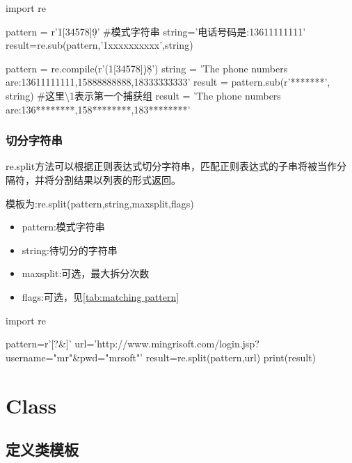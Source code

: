 \documentclass{article}
\begin{document}
        \begin{codeblock}[language=python, caption={string substitution}]
          import re

          pattern = r'1[34578]\d{9}' #模式字符串
          string='电话号码是:13611111111'
          result=re.sub(pattern,'1xxxxxxxxxx',string)

          pattern = re.compile(r'(1[34578]\d)\d{8}')
          string = 'The phone numbers are:13611111111,15888888888,18333333333'
          result = pattern.sub(r'\1********', string) #这里\textbackslash 1表示第一个捕获组
          result = 'The phone numbers are:136********,158********,183********'
        \end{codeblock}

      \subsubsection{切分字符串}
        re.split方法可以根据正则表达式切分字符串，匹配正则表达式的子串将被当作分隔符，并将分割结果以列表的形式返回。

        模板为:re.split(pattern,string,\lbrack maxsplit\rbrack,\lbrack flags\rbrack)
        \begin{itemize}
          \item pattern:模式字符串
          \item string:待切分的字符串
          \item maxsplit:可选，最大拆分次数
          \item flags:可选，见\autoref{tab:matching pattern}
        \end{itemize}
        \begin{codeblock}[language=python, caption={string segmentation}]
          import re

          pattern=r'[?&]'
          url='http://www.mingrisoft.com/login.jsp?username="mr"&pwd="mrsoft"'
          result=re.split(pattern,url)
          print(result)
        \end{codeblock}

  \section{Class}

    \subsection{定义类模板}
\end{document}
